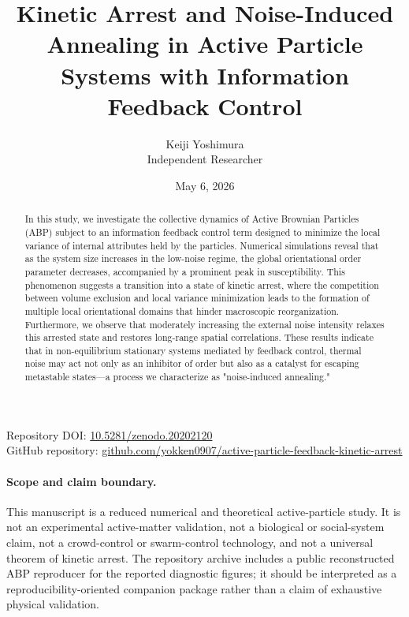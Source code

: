 \documentclass[12pt]{article}
\title{Kinetic Arrest and Noise-Induced Annealing in Active Particle Systems with Information Feedback Control}
\author{Keiji Yoshimura \\ \small Independent Researcher}
\date{May 6, 2026}
\begin{document}
\maketitle

\begin{center}
\small
Repository DOI: \href{https://doi.org/10.5281/zenodo.20202120}{10.5281/zenodo.20202120}\\
GitHub repository: \href{https://github.com/yokken0907/active-particle-feedback-kinetic-arrest}{github.com/yokken0907/active-particle-feedback-kinetic-arrest}
\end{center}

\begin{abstract}
In this study, we investigate the collective dynamics of Active Brownian Particles (ABP) subject to an information feedback control term designed to minimize the local variance of internal attributes held by the particles. Numerical simulations reveal that as the system size increases in the low-noise regime, the global orientational order parameter decreases, accompanied by a prominent peak in susceptibility. This phenomenon suggests a transition into a state of kinetic arrest, where the competition between volume exclusion and local variance minimization leads to the formation of multiple local orientational domains that hinder macroscopic reorganization. Furthermore, we observe that moderately increasing the external noise intensity relaxes this arrested state and restores long-range spatial correlations. These results indicate that in non-equilibrium stationary systems mediated by feedback control, thermal noise may act not only as an inhibitor of order but also as a catalyst for escaping metastable states—a process we characterize as "noise-induced annealing."
\end{abstract}

\paragraph{Scope and claim boundary.}
This manuscript is a reduced numerical and theoretical active-particle study. It is not an experimental active-matter validation, not a biological or social-system claim, not a crowd-control or swarm-control technology, and not a universal theorem of kinetic arrest. The repository archive includes a public reconstructed ABP reproducer for the reported diagnostic figures; it should be interpreted as a reproducibility-oriented companion package rather than a claim of exhaustive physical validation.
\end{document}
